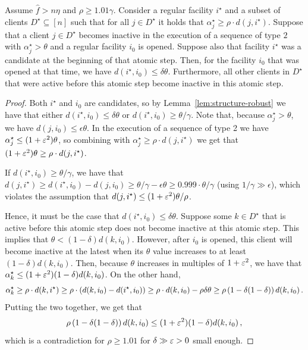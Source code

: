 \begin{lemma}
    \label{lem:freezing-robust}
    Assume $\hat{f} > n \eta$ and $\rho \geq 1.01 \gamma$.
    Consider a regular facility $i^\star$ and a subset of clients $D^\star \subseteq [n]$ such that for all $j \in D^\star$ it holds that $\alpha^\star_j \geq \rho \cdot d(j, i^\star)$.
    Suppose that a client $j \in D^\star$ becomes inactive in the execution of a sequence of type $2$ with $\alpha_j^\star > \theta$ and a regular facility $i_0$ is opened.
    Suppose also that facility $i^\star$ was a candidate at the beginning of that atomic step.
    Then, for the facility $i_0$ that was opened at that time, we have $d(i^\star, i_0) \leq \delta \theta$.
    Furthermore, all other clients in $D^\star$  that were active before this atomic step become inactive in this atomic step.
\end{lemma}
\begin{proof}
    Both $i^\star$ and $i_0$ are candidates, so by Lemma~\ref{lem:structure-robust} we have that either $d(i^\star,i_0) \leq \delta \theta$ or $d(i^\star,i_0) \geq \theta/\gamma$.
    Note that, because $\alpha_j^\star > \theta$, we have $d(j, i_0) \leq \epsilon \theta$.
    In the execution of a sequence of type 2 we have $\alpha^\star_j \leq (1+\varepsilon^2) \theta$, so combining with $\alpha_j^\star \geq \rho \cdot d(j, i^\star)$ we get that $(1+\varepsilon^2) \theta \geq \rho \cdot d(j, i^\star)$.

    If $d(i^\star, i_0) \geq \theta/\gamma$, we have that $d(j, i^\star) \geq d(i^\star, i_0) - d(j, i_0) \geq \theta/\gamma - \epsilon\theta \geq 0.999 \cdot \theta/\gamma$ (using $1/\gamma \gg \epsilon$), which violates the assumption that $d(j, i^\star) \leq (1+\varepsilon^2) \theta/\rho$.

    Hence, it must be the case that $d(i^\star, i_0) \leq \delta \theta$.
    Suppose some $k \in D^\star$ that is active before this atomic step does not become inactive at this atomic step.
    This implies that $\theta < (1-\delta) d(k, i_0)$.
    However, after $i_0$ is opened, this client will become inactive at the latest when its $\theta$ value increases to at least $(1-\delta) d(k, i_0)$.
    Then, because $\theta$ increases in multiples of $1+\varepsilon^2$, we have that $\alpha^\star_k \leq (1+\varepsilon^2)(1-\delta)d(k, i_0)$.
    On the other hand,
    \[\alpha^\star_k \geq \rho \cdot d(k, i^\star) \geq \rho \cdot (d(k, i_0) - d(i^\star, i_0)) \geq \rho \cdot d(k, i_0) - \rho \delta \theta \geq \rho \left(1 - \delta(1-\delta)\right) d(k, i_0)\,.\]
    Putting the two together, we get that
    \[\rho \left(1 - \delta(1-\delta)\right) d(k, i_0) \leq (1+\varepsilon^2)(1-\delta)d(k, i_0)\,,\]
    which is a contradiction for $\rho \geq 1.01$ for $\delta \gg \varepsilon > 0$ small enough.
\end{proof}

